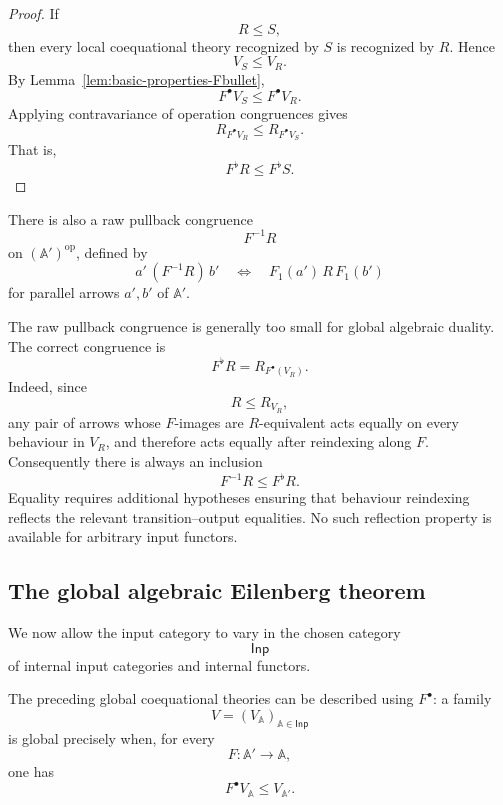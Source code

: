 \begin{proof}
    If
    \[
        R\leq S,
    \]
    then every local coequational theory recognized by \(S\) is recognized by
    \(R\). Hence
    \[
        V_S\leq V_R.
    \]
    By Lemma~\ref{lem:basic-properties-Fbullet},
    \[
        F^\bullet V_S\leq F^\bullet V_R.
    \]
    Applying contravariance of operation congruences gives
    \[
        R_{F^\bullet V_R}
        \leq
        R_{F^\bullet V_S}.
    \]
    That is,
    \[
        F^\flat R\leq F^\flat S.
    \]
\end{proof}

\begin{remark}
\label{rem:raw-pullback-versus-operational-pullback}
    There is also a raw pullback congruence
    \[
        F^{-1}R
    \]
    on \((\mathbb A')^{\mathrm{op}}\), defined by
    \[
        a'\,(F^{-1}R)\,b'
        \quad\Longleftrightarrow\quad
        F_1(a')\,R\,F_1(b')
    \]
    for parallel arrows \(a',b'\) of \(\mathbb A'\).

    The raw pullback congruence is generally too small for global algebraic
    duality. The correct congruence is
    \[
        F^\flat R=R_{F^\bullet(V_R)}.
    \]
    Indeed, since
    \[
        R\leq R_{V_R},
    \]
    any pair of arrows whose \(F\)-images are \(R\)-equivalent acts equally on
    every behaviour in \(V_R\), and therefore acts equally after reindexing
    along \(F\). Consequently there is always an inclusion
    \[
        F^{-1}R\leq F^\flat R.
    \]
    Equality requires additional hypotheses ensuring that behaviour reindexing
    reflects the relevant transition--output equalities. No such reflection
    property is available for arbitrary input functors.
\end{remark}

\subsection{The global algebraic Eilenberg theorem}
\label{subsec:global-algebraic-eilenberg}

We now allow the input category to vary in the chosen category
\[
    \mathsf{Inp}
\]
of internal input categories and internal functors.

The preceding global coequational theories can be described using
\(F^\bullet\): a family
\[
    V=(V_{\mathbb A})_{\mathbb A\in\mathsf{Inp}}
\]
is global precisely when, for every
\[
    F:\mathbb A'\to\mathbb A,
\]
one has
\[
    F^\bullet V_{\mathbb A}\leq V_{\mathbb A'}.
\]

